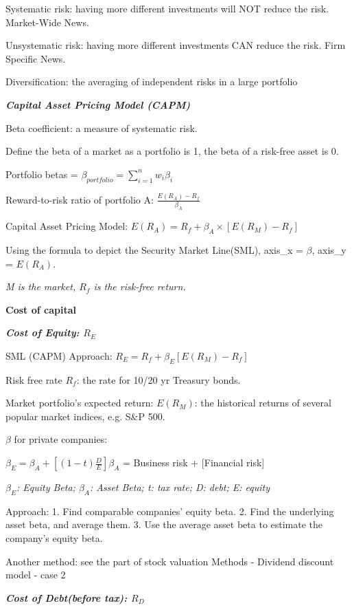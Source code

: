\documentclass{article}
\newcommand{\bigtitle}[1]{
	\noindent
	\textbf{#1}
}
\newcommand{\smalltitle}[1]{
	\noindent
	\textbf{\textit{#1}}
}
\begin{document}
Systematic risk: having more different investments will NOT reduce the risk. Market-Wide News.

Unsystematic risk: having more different investments CAN reduce the risk. Firm Specific News.

Diversification: the averaging of independent risks in a large portfolio

\smalltitle{Capital Asset Pricing Model (CAPM)}

Beta coefficient: a measure of systematic risk.

Define the beta of a market as a portfolio is 1, the beta of a risk-free asset is 0.

Portfolio betas = $\beta_{portfolio} = \sum _{i=1}^nw_i\beta_i$

Reward-to-risk ratio of portfolio A: $\frac{E(R_A)-R_f}{\beta_A}$

Capital Asset Pricing Model: 
$E(R_A) = R_f+\beta_A\times [E(R_M)-R_f]$

Using the formula to depict the Security Market Line(SML), axis\_x = $\beta$, axis\_y = $E(R_A)$.

\textit{M is the market, $R_f$ is the risk-free return.}

\bigtitle{Cost of capital}

\smalltitle{Cost of Equity: $R_E$}

SML (CAPM) Approach:
$R_E = R_f + \beta_E \left[E(R_M)-R_f\right]$

Risk free rate $R_f$: the rate for 10/20 yr Treasury bonds.

Market portfolio's expected return: $E(R_M)$: the historical returns of several popular market indices, e.g. S\&P 500.


$\beta$ for private companies: 

$\beta_E = \beta_A + \left[(1-t)\frac{D}{E}\right]\beta_A$ = Business risk + [Financial risk]

\textit{$\beta_E$: Equity Beta; $\beta_A$: Asset Beta; t: tax rate; D: debt; E: equity}

Approach: 1. Find comparable companies' equity beta. 2. Find the underlying asset beta, and average them. 3. Use the average asset beta to estimate the company's equity beta.

Another method: see the part of stock valuation Methods - Dividend discount model - case 2

\smalltitle{Cost of Debt(before tax): $R_D$}
\end{document}
